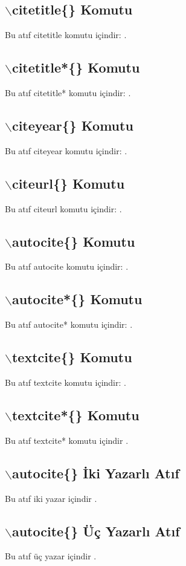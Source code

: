 \subsection{$\backslash$citetitle\{\} Komutu}
Bu atıf citetitle komutu içindir: .
\subsection{$\backslash$citetitle*\{\} Komutu}
Bu atıf citetitle* komutu içindir: .
\subsection{$\backslash$citeyear\{\} Komutu}
Bu atıf citeyear komutu içindir: \citeyear{tekyazarArticle}.
\subsection{$\backslash$citeurl\{\} Komutu}
Bu atıf citeurl komutu içindir: .
\subsection{$\backslash$autocite\{\} Komutu}
Bu atıf autocite komutu içindir: \autocite{tekyazarArticle}.
\subsection{$\backslash$autocite*\{\} Komutu}
Bu atıf autocite* komutu içindir: \autocite*{tekyazarArticle2}.
\subsection{$\backslash$textcite\{\} Komutu}
Bu atıf textcite komutu içindir: \textcite{tekyazarArticle}.
\subsection{$\backslash$textcite*\{\} Komutu}
Bu atıf textcite* komutu içindir \textcite*{tekyazarArticle2}.
\subsection{$\backslash$autocite\{\} İki Yazarlı Atıf}
Bu atıf iki yazar içindir \autocite{ikiyazarArticle}.
\subsection{$\backslash$autocite\{\} Üç Yazarlı Atıf}
Bu atıf üç yazar içindir \autocite{ucyazarArticle}.

